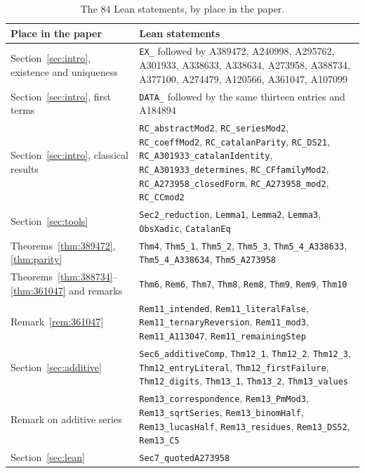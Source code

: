 \documentclass[11pt]{article}
\theoremstyle{remark}
\begin{document}
\begin{table}[ht]\centering\footnotesize
\begin{tabular}{@{}p{}p{}@{}}\toprule
Place in the paper & Lean statements\\\midrule
Section~\ref{sec:intro}, existence and uniqueness & \texttt{EX\_} followed by
A389472, A240998, A295762, A301933, A338633, A338634, A273958, A388734, A377100,
A274479, A120566, A361047, A107099\\
Section~\ref{sec:intro}, first terms & \texttt{DATA\_} followed by the same
thirteen entries and A184894\\
Section~\ref{sec:intro}, classical results & \texttt{RC\_abstractMod2},
\texttt{RC\_seriesMod2}, \texttt{RC\_coeffMod2}, \texttt{RC\_catalanParity},
\texttt{RC\_DS21}, \texttt{RC\_A301933\_catalanIdentity},
\texttt{RC\_A301933\_determines}, \texttt{RC\_CFfamilyMod2},
\texttt{RC\_A273958\_closedForm}, \texttt{RC\_A273958\_mod2},
\texttt{RC\_CCmod2}\\
Section~\ref{sec:tools} & \texttt{Sec2\_reduction}, \texttt{Lemma1},
\texttt{Lemma2}, \texttt{Lemma3}, \texttt{ObsXadic}, \texttt{CatalanEq}\\
Theorems~\ref{thm:389472}, \ref{thm:parity} & \texttt{Thm4}, \texttt{Thm5\_1},
\texttt{Thm5\_2}, \texttt{Thm5\_3}, \texttt{Thm5\_4\_A338633},
\texttt{Thm5\_4\_A338634}, \texttt{Thm5\_A273958}\\
Theorems~\ref{thm:388734}--\ref{thm:361047} and remarks & \texttt{Thm6},
\texttt{Rem6}, \texttt{Thm7}, \texttt{Thm8}, \texttt{Rem8}, \texttt{Thm9},
\texttt{Rem9}, \texttt{Thm10}\\
Remark~\ref{rem:361047} & \texttt{Rem11\_intended},
\texttt{Rem11\_literalFalse}, \texttt{Rem11\_ternaryReversion},
\texttt{Rem11\_mod3}, \texttt{Rem11\_A113047}, \texttt{Rem11\_remainingStep}\\
Section~\ref{sec:additive} & \texttt{Sec6\_additiveComp}, \texttt{Thm12\_1},
\texttt{Thm12\_2}, \texttt{Thm12\_3}, \texttt{Thm12\_entryLiteral},
\texttt{Thm12\_firstFailure}, \texttt{Thm12\_digits}, \texttt{Thm13\_1},
\texttt{Thm13\_2}, \texttt{Thm13\_values}\\
Remark on additive series & \texttt{Rem13\_correspondence},
\texttt{Rem13\_PmMod3}, \texttt{Rem13\_sqrtSeries}, \texttt{Rem13\_binomHalf},
\texttt{Rem13\_lucasHalf}, \texttt{Rem13\_residues}, \texttt{Rem13\_DS52},
\texttt{Rem13\_C5}\\
Section~\ref{sec:lean} & \texttt{Sec7\_quotedA273958}\\\bottomrule
\end{tabular}
\caption{The $84$ Lean statements, by place in the paper.}\label{tab:lean}
\end{table}
\end{document}
